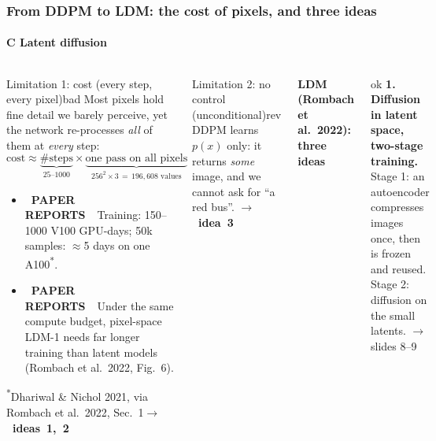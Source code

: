\documentclass[aspectratio=169,9pt,xcolor=table]{beamer}
\newcommand{\pill}[2]{{\setlength{\fboxsep}{1.2pt}\colorbox{#1}{\color{white}\fontsize{6}{7}\selectfont\bfseries\ #2\ }}}
\newcommand{\paper}{\pill{hcmusblue}{PAPER REPORTS}}
\begin{document}
\begin{frame}
\frametitle{From DDPM to LDM: the cost of pixels, and three ideas}
\framesubtitle{C \textperiodcentered{} Latent diffusion}
\begin{columns}[T,onlytextwidth]
\begin{tbox}[fontupper=\footnotesize]{Limitation 1: cost (every step, every pixel)}{bad}
\setlength{\abovedisplayskip}{2pt}\setlength{\belowdisplayskip}{2pt}
Most pixels hold fine detail we barely perceive, yet the network re-processes \emph{all} of them at \emph{every} step:
\[\text{cost}\approx\underbrace{\#\text{steps}}_{25\text{--}1000}\times\underbrace{\text{one pass on all pixels}}_{256^2\times3\,=\,196{,}608\text{ values}}\]
\begin{itemize}\setlength{\itemsep}{1pt}
\item \paper\ Training: 150--1000 V100 GPU-days; 50k samples: $\approx$5 days on one A100\textsuperscript{*}.
\item \paper\ Under the same compute budget, pixel-space LDM-1 needs far longer training than latent models (Rombach et al.\ 2022, Fig.~6).
\end{itemize}
{\scriptsize\color{muted}\textsuperscript{*}Dhariwal \& Nichol 2021, via Rombach et al.\ 2022, Sec.~1}\hfill\mbox{\color{ok!75!black}\bfseries$\rightarrow$ ideas 1, 2}
\end{tbox}
\begin{tbox}[fontupper=\footnotesize,after skip=0pt]{Limitation 2: no control (unconditional)}{rev}
DDPM learns $p(x)$ only: it returns \emph{some} image, and we cannot ask for ``a red bus''. \hfill\mbox{\color{ok!75!black}\bfseries$\rightarrow$ idea 3}
\end{tbox}
{\small\bfseries\color{ok!75!black}LDM (Rombach et al.\ 2022): three ideas}\par\vspace{1.2mm}
\begin{nbox}[fontupper=\footnotesize,colback=lightgreen]{ok}
\textbf{1. Diffusion in latent space, two-stage training.} Stage 1: an autoencoder compresses images once, then is frozen and reused. Stage 2: diffusion on the small latents. {\color{muted}$\rightarrow$ slides 8--9}
\end{nbox}

\end{columns}
\end{frame}
\end{document}
